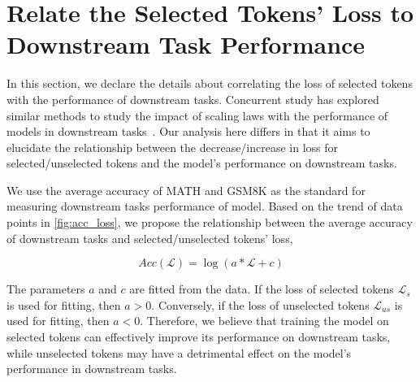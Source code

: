 \section{Relate the Selected Tokens' Loss to Downstream Task Performance}
\label{sec:appendix:acc_loss}

In this section, we declare the details about correlating the loss of selected tokens with the performance of downstream tasks. Concurrent study has explored similar methods to study the impact of scaling laws with the performance of models in downstream tasks~\citep{gadre2024LanguageMS}. Our analysis here differs in that it aims to elucidate the relationship between the decrease/increase in loss for selected/unselected tokens and the model's performance on downstream tasks. 

We use the average accuracy of MATH and GSM8K as the standard for measuring downstream tasks performance of model. Based on the trend of data points in \autoref{fig:acc_loss}, we propose the relationship between the average accuracy of downstream tasks and selected/unselected tokens' loss,

\begin{equation}
Acc(\mathcal{L}) = \log (a * \mathcal{L} + c)
\end{equation}

The parameters $a$ and $c$ are fitted from the data. If the loss of selected tokens $\mathcal{L}_s$ is used for fitting, then $a > 0$. Conversely, if the loss of unselected tokens $\mathcal{L}_{us}$ is used for fitting, then $a < 0$. Therefore, we believe that training the model on selected tokens can effectively improve its performance on downstream tasks, while unselected tokens may have a detrimental effect on the model's performance in downstream tasks.